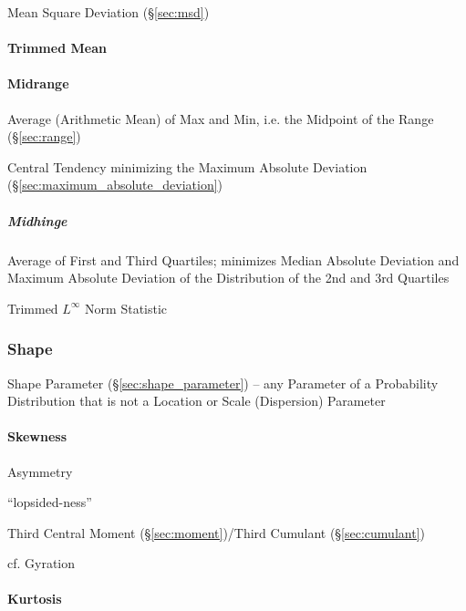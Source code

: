 \fist Mean Square Deviation (\S\ref{sec:msd})



\paragraph{Trimmed Mean}\label{sec:trimmed_mean}\hfill



\paragraph{Midrange}\label{sec:midrange}\hfill

Average (Arithmetic Mean) of Max and Min, i.e. the Midpoint of the Range
(\S\ref{sec:range})

Central Tendency minimizing the Maximum Absolute Deviation
(\S\ref{sec:maximum_absolute_deviation})



\subparagraph{Midhinge}\label{sec:midhinge}\hfill

Average of First and Third Quartiles; minimizes Median Absolute Deviation and
Maximum Absolute Deviation of the Distribution of the 2nd and 3rd Quartiles

Trimmed $L^\infty$ Norm Statistic



\subsubsection{Shape}\label{sec:distribution_shape}

\fist Shape Parameter (\S\ref{sec:shape_parameter}) -- any Parameter of a
Probability Distribution that is not a Location or Scale (Dispersion) Parameter



\paragraph{Skewness}\label{sec:skewness}\hfill

Asymmetry %

``lopsided-ness''

Third Central Moment (\S\ref{sec:moment})/Third Cumulant (\S\ref{sec:cumulant})

cf. Gyration



\paragraph{Kurtosis}\label{sec:kurtosis}\hfill

